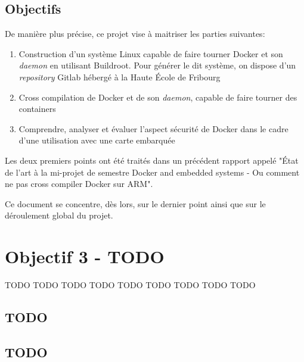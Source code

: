 \documentclass[11pt,a4paper,oneside]{report}
\begin{document}
\section{Objectifs}

De manière plus précise, ce projet vise à maitriser les parties suivantes:

\begin{enumerate}
  \item Construction d'un système Linux capable de faire tourner Docker et son \emph{daemon} en utilisant Buildroot. Pour générer le dit système, on dispose d'un \emph{repository} Gitlab hébergé à la Haute École de Fribourg

  \item Cross compilation de Docker et de son \emph{daemon}, capable de faire tourner des containers
  
  \item Comprendre, analyser et évaluer l'aspect sécurité de Docker dans le cadre d'une utilisation avec une carte embarquée
\end{enumerate}

Les deux premiers points ont été traités dans un précédent rapport appelé "État de l’art à la mi-projet de semestre Docker and embedded systems - Ou comment ne pas cross compiler Docker sur ARM".

Ce document se concentre, dès lors, sur le dernier point ainsi que sur le déroulement global du projet.


\chapter{Objectif 3 - TODO}

TODO TODO TODO TODO TODO TODO TODO TODO TODO 

\section{TODO}


\begin{appendices}
  \chapter{TODO}

\end{appendices}
\end{document}

